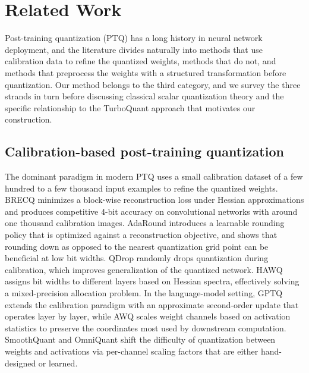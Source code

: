 
\section{Related Work}
\label{sec:related}

Post-training quantization (PTQ) has a long history in neural network
deployment, and the literature divides naturally into methods that use
calibration data to refine the quantized weights, methods that do not,
and methods that preprocess the weights with a structured transformation
before quantization. Our method belongs to the third category, and we
survey the three strands in turn before discussing classical scalar
quantization theory and the specific relationship to the TurboQuant
approach that motivates our construction.

\subsection{Calibration-based post-training quantization}

The dominant paradigm in modern PTQ uses a small calibration dataset of
a few hundred to a few thousand input examples to refine the quantized
weights. BRECQ \citep{li2021brecq} minimizes a block-wise reconstruction
loss under Hessian approximations and produces competitive 4-bit
accuracy on convolutional networks with around one thousand calibration
images. AdaRound \citep{nagel2020adaround} introduces a learnable
rounding policy that is optimized against a reconstruction objective,
and shows that rounding down as opposed to the nearest quantization grid
point can be beneficial at low bit widths. QDrop \citep{wei2022qdrop}
randomly drops quantization during calibration, which improves
generalization of the quantized network. HAWQ \citep{dong2019hawq}
assigns bit widths to different layers based on Hessian spectra,
effectively solving a mixed-precision allocation problem. In the
language-model setting, GPTQ \citep{frantar2022gptq} extends the
calibration paradigm with an approximate second-order update that
operates layer by layer, while AWQ \citep{lin2023awq} scales weight
channels based on activation statistics to preserve the coordinates
most used by downstream computation. SmoothQuant \citep{xiao2023smoothquant}
and OmniQuant \citep{shao2024omniquant} shift the difficulty of
quantization between weights and activations via per-channel scaling
factors that are either hand-designed or learned.

